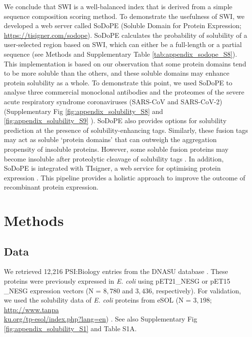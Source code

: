 We conclude that SWI is a well-balanced index that is derived from a simple sequence composition scoring method. To demonstrate the usefulness of SWI, we developed a web server called SoDoPE (Soluble Domain for Protein Expression; \href{https://tisigner.com/sodope}{https://tisigner.com/sodope}). SoDoPE calculates the probability of solubility of a user-selected region based on SWI, which can either be a full-length or a partial sequence (see Methods and Supplementary Table \ref{tab:appendix_sodope_S8}). This implementation is based on our observation that some protein domains tend to be more soluble than the others, and these soluble domains may enhance protein solubility as a whole. To demonstrate this point, we used SoDoPE to analyse three commercial monoclonal antibodies and the proteomes of the severe acute respiratory syndrome coronaviruses (SARS-CoV and SARS-CoV-2) \citep{Marra2003-zt,Wang2009-vj,Wu2020-oo} (Supplementary Fig \ref{fig:appendix_solubility_S8}  and \ref{fig:appendix_solubility_S9} ). SoDoPE also provides options for solubility prediction at the presence of solubility-enhancing tags. Similarly, these fusion tags may act as soluble ‘protein domains’ that can outweigh the aggregation propensity of insoluble proteins. However, some soluble fusion proteins may become insoluble after proteolytic cleavage of solubility tags \citep{Lebendiker2014-di}. In addition, SoDoPE is integrated with TIsigner, a web service for optimising protein expression \citep{Bhandari2021-wd}. This pipeline provides a holistic approach to improve the outcome of recombinant protein expression. \vspace*{-10pt}


\section{Methods}

\subsection{Data}
We retrieved 12,216 PSI:Biology entries from the DNASU database \citep{Chen2004-cp,Acton2005-ng,Seiler2014-on}. These proteins were previously expressed in {\it E. coli} using pET21\_NESG or pET15 \_NESG expression vectors (N = $8,780$ and $3,436$, respectively). For validation, we used the solubility data of {\it E. coli} proteins from eSOL (N = $3,198$; \href{http://www.tanpaku.org/tp-esol/index.php?lang=en}{http://www.tanpa\\ku.org/tp-esol/index.php?lang=en}) \citep{Niwa2009-ye}. See also Supplementary Fig \ref{fig:appendix_solubility_S1}  and Table S1A. 

